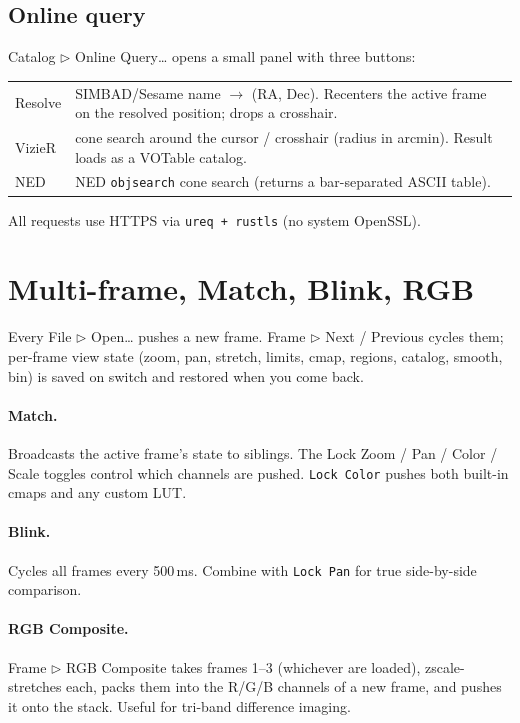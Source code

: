 \documentclass[11pt,a4paper]{article}
\begin{document}
\subsection{Online query}\label{sec:online}

\textsf{Catalog $\triangleright$ Online Query\dots} opens a small panel
with three buttons:

\begin{tabular}{@{}>{\sffamily}lp{}@{}}
\toprule
Resolve & SIMBAD/Sesame name $\to$ (RA, Dec). Recenters the active frame
          on the resolved position; drops a crosshair. \\
VizieR  & cone search around the cursor / crosshair (radius in arcmin).
          Result loads as a VOTable catalog. \\
NED     & NED \texttt{objsearch} cone search (returns a bar-separated
          ASCII table). \\
\bottomrule
\end{tabular}

All requests use HTTPS via \texttt{ureq + rustls} (no system OpenSSL).

\section{Multi-frame, Match, Blink, RGB}

Every \textsf{File $\triangleright$ Open\dots} pushes a new frame.
\textsf{Frame $\triangleright$ Next / Previous} cycles them; per-frame
view state (zoom, pan, stretch, limits, cmap, regions, catalog, smooth,
bin) is saved on switch and restored when you come back.

\paragraph{Match.} Broadcasts the active frame's state to siblings. The
\textsf{Lock Zoom / Pan / Color / Scale} toggles control which channels
are pushed. \texttt{Lock Color} pushes both built-in cmaps and any custom
LUT.

\paragraph{Blink.} Cycles all frames every 500\,ms. Combine with
\texttt{Lock Pan} for true side-by-side comparison.

\paragraph{RGB Composite.} \textsf{Frame $\triangleright$ RGB Composite}
takes frames 1--3 (whichever are loaded), zscale-stretches each, packs
them into the R/G/B channels of a new frame, and pushes it onto the
stack. Useful for tri-band difference imaging.
\end{document}
